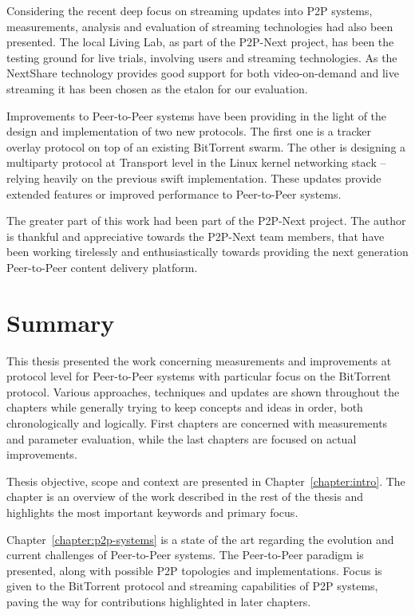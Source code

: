 Considering the recent deep focus on streaming updates into P2P systems,
measurements, analysis and evaluation of streaming technologies had also been
presented. The local Living Lab, as part of the P2P-Next project, has been the
testing ground for live trials, involving users and streaming technologies. As
the NextShare technology provides good support for both video-on-demand and
live streaming it has been chosen as the etalon for our evaluation.

Improvements to Peer-to-Peer systems have been providing in the light of the
design and implementation of two new protocols. The first one is a tracker
overlay protocol on top of an existing BitTorrent swarm. The other is
designing a multiparty protocol at Transport level in the Linux kernel
networking stack -- relying heavily on the previous swift implementation.
These updates provide extended features or improved performance to
Peer-to-Peer systems.

The greater part of this work had been part of the P2P-Next project. The
author is thankful and appreciative towards the P2P-Next team members, that
have been working tirelessly and enthusiastically towards providing the next
generation Peer-to-Peer content delivery platform.

\section{Summary}
\label{sec:conclusion:summary}

This thesis presented the work concerning measurements and improvements at
protocol level for Peer-to-Peer systems with particular focus on the
BitTorrent protocol. Various approaches, techniques and updates are shown
throughout the chapters while generally trying to keep concepts and ideas in
order, both chronologically and logically. First chapters are concerned with
measurements and parameter evaluation, while the last chapters are focused on
actual improvements.

Thesis objective, scope and context are presented in
Chapter~\ref{chapter:intro}. The chapter is an overview of the work described
in the rest of the thesis and highlights the most important keywords and
primary focus.

Chapter~\ref{chapter:p2p-systems} is a state of the art regarding the
evolution and current challenges of Peer-to-Peer systems. The Peer-to-Peer
paradigm is presented, along with possible P2P topologies and implementations.
Focus is given to the BitTorrent protocol and streaming capabilities of P2P
systems, paving the way for contributions highlighted in later chapters.

